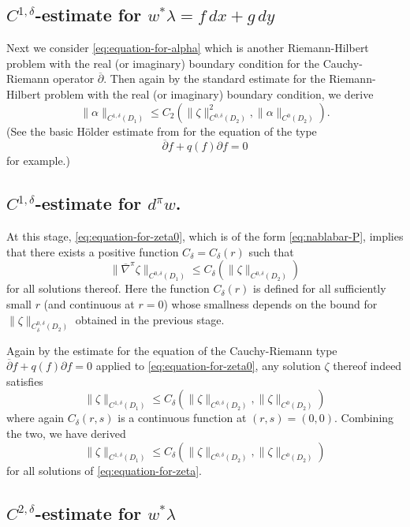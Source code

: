 \documentclass[reqno]{amsart}
\newcommand{\del}{\partial}
\newcommand{\be}{\begin{equation}}
\newcommand{\ee}{\end{equation}}
\theoremstyle{theorem}
\theoremstyle{definition}
\numberwithin{equation}{section}
\def\delbar{{\overline \partial}}
\def\delbar{{\overline \partial}}
\begin{document}
\subsection{$C^{1,\delta}$-estimate for $w^*\lambda = f\, dx + g\, dy$}

Next we consider \eqref{eq:equation-for-alpha} which is another
Riemann-Hilbert problem with the real (or imaginary) boundary condition for the
Cauchy-Riemann operator $\delbar$.
Then again by the standard estimate for the Riemann-Hilbert problem
with the real (or imaginary) boundary condition, we derive
\be\label{eq:|alpha|22}
\|\alpha\|_{C^{1,\delta}(D_1)} \leq C_2 (\|\zeta\|^2_{C^{0,\delta}(D_2)}, \|\alpha\|_{C^0(D_2)}).
\ee
(See the basic H\"older estimate from \cite[Proposition 2.3.6]{sikorav:holo}
 for the equation of the type
$$
\delbar f + q(f) \del f = 0
$$
for example.)

\subsection{$C^{1,\delta}$-estimate for $d^\pi w$.}

At this stage, \eqref{eq:equation-for-zeta0}, which is of the form \eqref{eq:nablabar-P},
 implies that there exists a positive function $C_\delta = C_\delta(r)$  such that
$$
\|\overline \nabla^\pi \zeta\|_{C^{0,\delta}(D_1)} \leq C_\delta (\|\zeta \|_{C^{0,\delta}(D_2)})
$$
for all solutions thereof.  Here the function $C_\delta(r)$ is defined for all sufficiently small
$r$ (and continuous at $r = 0$) whose smallness depends on the bound for
$\|\zeta \|_{C_\delta^{0,\delta}(D_2)}$ obtained in the previous stage.

Again by the estimate for the equation of the Cauchy-Riemann type
$\delbar f + q(f) \del f = 0$  applied to \eqref{eq:equation-for-zeta0},
any solution $\zeta$ thereof indeed satisfies
$$
\|\zeta\|_{C^{1,\delta}(D_1)} \leq  C_\delta (\|\zeta \|_{C^{0,\delta}(D_2)},
\|\zeta \|_{C^{0}(D_2)})
$$
where again $C_\delta(r,s)$ is a continuous function at $(r,s) = (0,0)$.
Combining the two, we have derived
\be\label{eq:zeta-1delta}
\|\zeta\|_{C^{1,\delta}(D_1)}\leq C_\delta( \|\zeta \|_{C^{0,\delta}(D_2)},
\|\zeta \|_{C^{0}(D_2)})
\ee
for all solutions of \eqref{eq:equation-for-zeta}.

\subsection{$C^{2,\delta}$-estimate for $w^*\lambda$}
\end{document}
